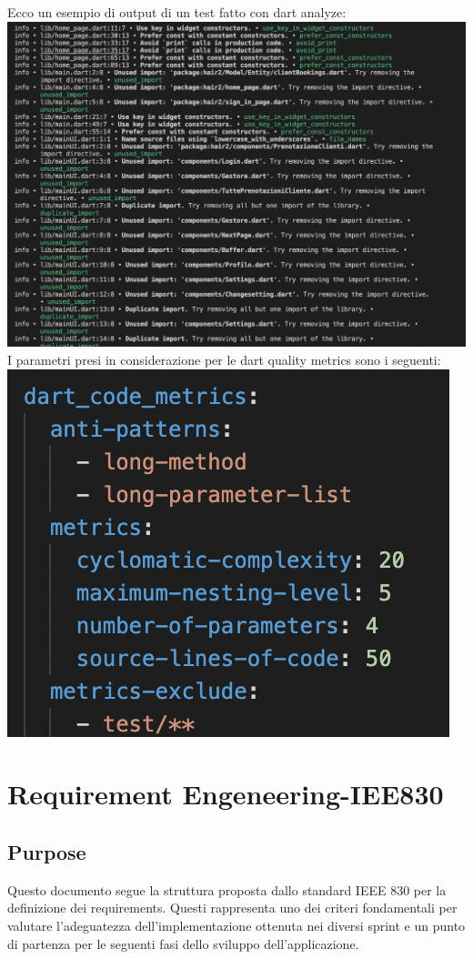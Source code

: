 \documentclass{article}
\begin{document}
Ecco un esempio di output di un test fatto con dart analyze:
\\\includegraphics[scale = 0.5]{"Immagini/Dart_analyze.png"}
\\I parametri presi in considerazione per le dart quality metrics sono i seguenti:
\\\includegraphics[scale = 0.5]{"Immagini/ParametriQuality.png"}
\newpage
\section{Requirement Engeneering-IEE830}
\subsection{Purpose} 
Questo documento segue la struttura proposta dallo standard IEEE 830 per la definizione dei requirements. Questi rappresenta uno dei criteri fondamentali per valutare l’adeguatezza dell’implementazione ottenuta nei diversi sprint e un punto di partenza per le seguenti fasi dello sviluppo dell’applicazione.
\end{document}

